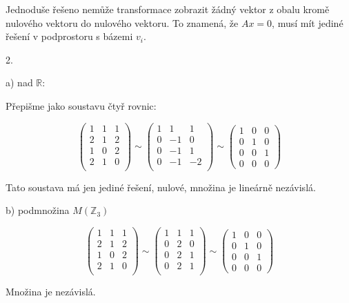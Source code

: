 \documentclass[10pt,a4paper]{article}
\begin{document}
Jednoduše řešeno nemůže transformace zobrazit žádný vektor z obalu kromě nulového vektoru do nulového vektoru. To znamená, že
$Ax = 0$, musí mít jediné řešení v podprostoru s bázemi $v_i$.



2.

a) nad $\mathbb{R}$:

Přepišme jako soustavu čtyř rovnic:

\begin{equation*}
\begin{pmatrix}
1 & 1 & 1 \\
2 & 1 & 2 \\
1 & 0 & 2 \\
2 & 1 & 0 \\ 
\end{pmatrix}
\sim
\begin{pmatrix}
1 & 1 & 1 \\
0 & -1& 0 \\
0 & -1& 1 \\
0 & -1& -2\\ 
\end{pmatrix}
\sim
\begin{pmatrix}
1 & 0& 0 \\
0 & 1& 0 \\
0 & 0& 1 \\ 
0 & 0& 0 
\end{pmatrix}
\end{equation*}

Tato soustava má jen jediné řešení, nulové, množina je lineárně nezávislá.

b)  podmnožina $M(\mathbb{Z}_3)$ 


\begin{equation*}
\begin{pmatrix}
1 & 1 & 1 \\
2 & 1 & 2 \\
1 & 0 & 2 \\
2 & 1 & 0 \\ 
\end{pmatrix}
\sim
\begin{pmatrix}
1 & 1 & 1 \\
0 & 2 & 0 \\
0 & 2 & 1 \\
0 & 2 & 1 \\ 
\end{pmatrix}
\sim
\begin{pmatrix}
1 & 0& 0 \\
0 & 1& 0 \\
0 & 0& 1 \\ 
0 & 0& 0 
\end{pmatrix}
\end{equation*}

Množina je nezávislá.
\end{document}
